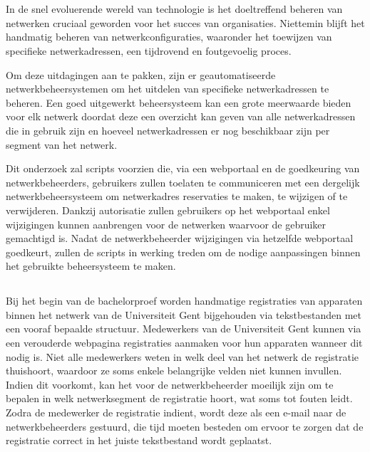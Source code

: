 
\chapter{}%
\label{ch:inleiding}
In de snel evoluerende wereld van technologie is het doeltreffend beheren van netwerken cruciaal geworden voor het succes van organisaties. Niettemin blijft het handmatig beheren van netwerkconfiguraties, waaronder het toewijzen van specifieke netwerkadressen, een tijdrovend en foutgevoelig proces.

Om deze uitdagingen aan te pakken, zijn er geautomatiseerde netwerkbeheersystemen om het uitdelen van specifieke netwerkadressen te beheren. Een goed uitgewerkt beheersysteem kan een grote meerwaarde bieden voor elk netwerk doordat deze een overzicht kan geven van alle netwerkadressen die in gebruik zijn en hoeveel netwerkadressen er nog beschikbaar zijn per segment van het netwerk.

Dit onderzoek zal scripts voorzien die, via een webportaal en de goedkeuring van netwerkbeheerders, gebruikers zullen toelaten te communiceren met een dergelijk netwerkbeheersysteem om netwerkadres reservaties te maken, te wijzigen of te verwijderen. Dankzij autorisatie zullen gebruikers op het webportaal enkel wijzigingen kunnen aanbrengen voor de netwerken waarvoor de gebruiker gemachtigd is. Nadat de netwerkbeheerder wijzigingen via hetzelfde webportaal goedkeurt, zullen de scripts in werking treden om de nodige aanpassingen binnen het gebruikte beheersysteem te maken.

\section{}%
\label{sec:probleemstelling}
Bij het begin van de bachelorproef worden handmatige registraties van apparaten binnen het netwerk van de Universiteit Gent bijgehouden via tekstbestanden met een vooraf bepaalde structuur. Medewerkers van de Universiteit Gent kunnen via een verouderde webpagina registraties aanmaken voor hun apparaten wanneer dit nodig is. Niet alle medewerkers weten in welk deel van het netwerk de registratie thuishoort, waardoor ze soms enkele belangrijke velden niet kunnen invullen. Indien dit voorkomt, kan het voor de netwerkbeheerder moeilijk zijn om te bepalen in welk netwerksegment de registratie hoort, wat soms tot fouten leidt. Zodra de medewerker de registratie indient, wordt deze als een e-mail naar de netwerkbeheerders gestuurd, die tijd moeten besteden om ervoor te zorgen dat de registratie correct in het juiste tekstbestand wordt geplaatst.

